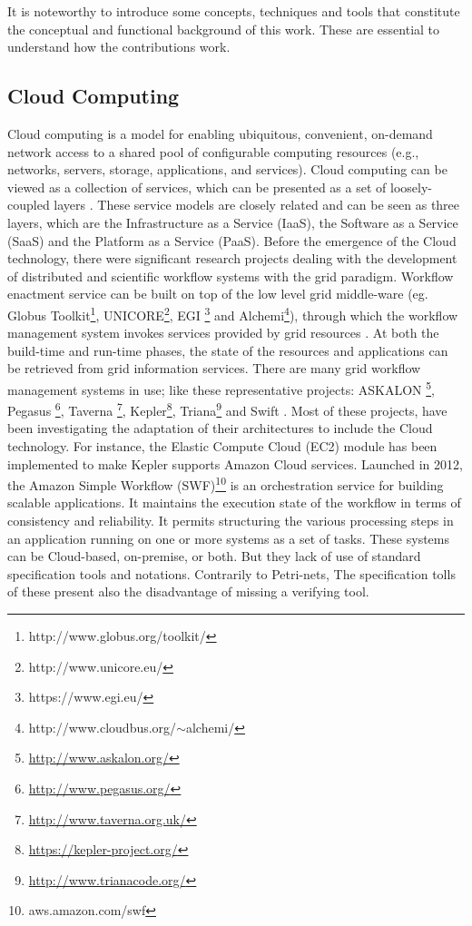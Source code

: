 \label{sec:functionality}
%
It is noteworthy to introduce some concepts, techniques and tools that constitute the conceptual and functional background of this work.
%
These are essential to understand how the contributions work.

%
\subsection{Cloud Computing}
%
Cloud computing is a model for enabling ubiquitous, convenient, on-demand network access to a shared pool of configurable computing resources (e.g., networks, servers, storage, applications, and services).
%
Cloud computing can be viewed as a collection of services, which can be presented as a set of loosely-coupled layers \cite{Mell+11}.
%
These service models are closely related and can be seen as three layers, which are the Infrastructure as a Service (IaaS), the Software as a Service (SaaS) and the Platform as a Service (PaaS).
%
Before the emergence of the Cloud technology, there were significant research projects dealing with the development of distributed and scientific workflow systems with the grid paradigm. 
%
Workflow enactment service can be built on top of the low level grid middle-ware (eg. Globus Toolkit\footnote{http://www.globus.org/toolkit/}, UNICORE\footnote{http://www.unicore.eu/}, EGI \footnote{https://www.egi.eu/} and Alchemi\footnote{http://www.cloudbus.org/$ \sim $alchemi/}), through which the workflow management system invokes services provided by grid resources \cite{YuB05}.
%
At both the build-time and run-time phases, the state of the resources and applications can be retrieved from grid information services. 
%
There are many grid workflow management systems in use; like these representative projects: ASKALON \footnote{\url{http://www.askalon.org/}}, Pegasus \footnote{\url{http://www.pegasus.org/}}, Taverna \footnote{\url{http://www.taverna.org.uk/}}, Kepler\footnote{\url{https://kepler-project.org/}}, Triana\footnote{\url{http://www.trianacode.org/}} and Swift \cite{Zhao+11}.
%
Most of these projects, have been investigating the adaptation of their architectures to include the Cloud technology.
%
For instance, the Elastic Compute Cloud (EC2) module has been implemented to make Kepler supports Amazon Cloud services.
%
Launched in 2012, the Amazon Simple Workflow (SWF)\footnote{aws.amazon.com/swf} is an orchestration service for building scalable applications.
%
It maintains the execution state of the workflow in terms of consistency and reliability.
%
It permits structuring the various processing steps in an application running on one or more systems as a set of tasks.
%
These systems can be Cloud-based, on-premise, or both. But they lack of use of standard specification tools and notations. Contrarily to Petri-nets, The specification tolls  of these present also the disadvantage of missing a verifying tool.
